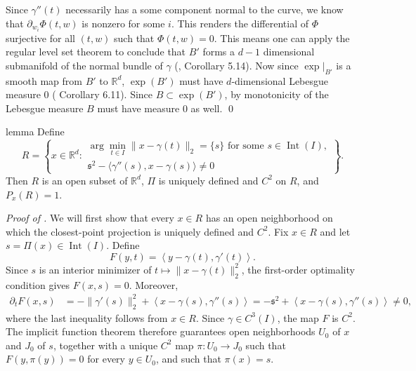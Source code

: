 \documentclass[11pt]{article}
\begin{document}
\begin{appendices}
Since $\gamma''(t)$ necessarily has a some component normal to the curve, we know that $\partial_{w_i}\Phi(t,w)$ is nonzero for some $i$. This renders the differential of $\Phi$ surjective for all $(t,w)$ such that $\Phi(t,w) = 0$. This means one can apply the regular level set theorem to conclude that $B'$ forms a $d-1$ dimensional submanifold of the normal bundle of $\gamma$ (\citet{lee2003smooth}, Corollary 5.14). Now since $\exp\big|_{B'}$ is a smooth map from $B'$ to $\mathbb{R}^d$, $\exp(B')$ must have $d$-dimensional Lebesgue measure $0$ (\citet{lee2003smooth} Corollary 6.11). Since $B \subset \exp(B')$, by monotonicity of the Lebesgue measure $B$ must have measure $0$ as well. \qed{}



\begin{restatable}{lemma}{} \label{lemma: IFT degen closed}
    Define
    \begin{equation}\label{R}
        R
        =
        \left\{
        x\in\mathbb{R}^d:
        \begin{array}{l}
        \arg\min_{t\in I}\|x-\gamma(t)\|_2=\{s\}
        \text{ for some }s\in\operatorname{Int}(I),\\[1mm]
        \mathfrak{s}^2
        -
        \langle\gamma''(s),x-\gamma(s)\rangle
        \neq0
        \end{array}
        \right\}.
    \end{equation}
    Then $R$ is an open subset of $\mathbb{R}^d$, $\Pi$ is uniquely defined and $C^2$ on $R$, and $P_x(R)=1.$
\end{restatable}

\noindent \textit{Proof of .}
We will first show that every $x\in R$ has an open neighborhood on which the closest-point projection is uniquely defined and $C^2$. Fix $x\in R$ and let $s=\Pi(x)\in\operatorname{Int}(I).$
Define
\[
    F(y,t)
    =
    \left\langle y-\gamma(t),\gamma'(t)\right\rangle.
\]
Since $s$ is an interior minimizer of $t\mapsto\|x-\gamma(t)\|_2^2$, the first-order optimality condition gives $F(x,s)=0.$ Moreover,
\begin{align*}
    \partial_tF(x,s)
    &=
    -\|\gamma'(s)\|_2^2
    +
    \left\langle x-\gamma(s),\gamma''(s)\right\rangle =
    -\mathfrak{s}^2
    +
    \left\langle x-\gamma(s),\gamma''(s)\right\rangle
    \neq0,
\end{align*}
where the last inequality follows from $x\in R$. Since $\gamma\in C^3(I)$, the map $F$ is $C^2$. The implicit function theorem \citet[Theorem C.40]{lee2003smooth} therefore guarantees open neighborhoods $U_0$ of $x$ and $J_0$ of $s$, together with a unique $C^2$ map $\pi:U_0\rightarrow J_0$ such that $F(y,\pi(y))=0$ for every $y\in U_0$, and such that $\pi(x)=s$.


\end{appendices}
\end{document}
